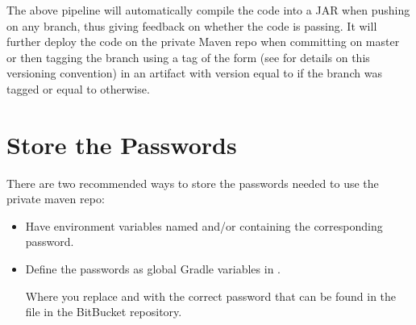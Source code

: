 \documentclass[letterpaper,10pt,english]{sphinxmanual}
\begin{document}
The above pipeline will automatically compile the code into a JAR when pushing on any branch, thus giving feedback on whether the code is passing.
It will further deploy the code on the private Maven repo when committing on master or then tagging the branch using a tag of the form  (see {\hyperref[\detokenize{software_engineering:semantic-versioning}]{}} for details on this versioning convention) in an artifact with version equal to  if the branch was tagged or equal to  otherwise.


\section{Store the Passwords}
\label{\detokenize{private_maven_repo:store-the-passwords}}\label{\detokenize{private_maven_repo:storing-passwords}}
There are two recommended ways to store the passwords needed to use the private maven repo:
\begin{itemize}
\item {} 
Have environment variables named  and/or  containing the corresponding password.

\item {} 
Define the passwords as global Gradle variables in .

\begin{sphinxVerbatim}[commandchars=\\\{\}]
 
 
\end{sphinxVerbatim}

Where you replace  and  with the correct password that can be found in the  file in the  BitBucket repository.

\end{itemize}
\end{document}
